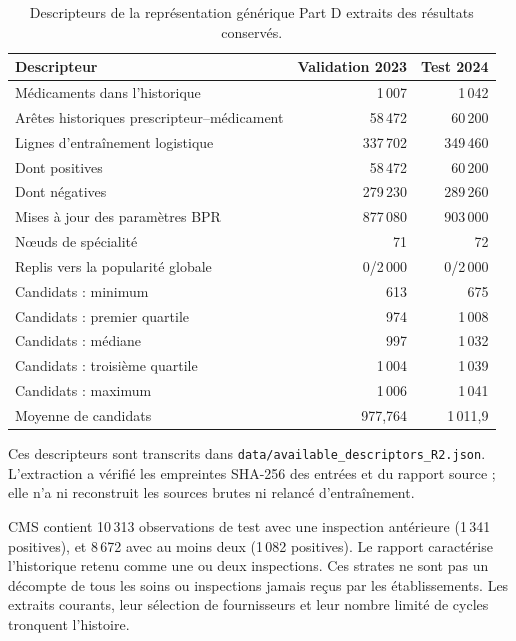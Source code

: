 \documentclass[10pt,a4paper]{article}
\newcommand{\src}[1]{{\small\nolinkurl{#1}}}
\begin{document}
\begin{table}[!htbp]\centering\small
\caption{Descripteurs de la représentation générique Part D extraits des résultats conservés.}
\begin{tabularx}{\linewidth}{@{}Xrr@{}}
\toprule
Descripteur & Validation 2023 & Test 2024\\
\midrule
Médicaments dans l'historique & 1\,007 & 1\,042\\
Arêtes historiques prescripteur--médicament & 58\,472 & 60\,200\\
Lignes d'entraînement logistique & 337\,702 & 349\,460\\
Dont positives & 58\,472 & 60\,200\\
Dont négatives & 279\,230 & 289\,260\\
Mises à jour des paramètres BPR & 877\,080 & 903\,000\\
Nœuds de spécialité & 71 & 72\\
Replis vers la popularité globale & 0/2\,000 & 0/2\,000\\
Candidats : minimum & 613 & 675\\
Candidats : premier quartile & 974 & 1\,008\\
Candidats : médiane & 997 & 1\,032\\
Candidats : troisième quartile & 1\,004 & 1\,039\\
Candidats : maximum & 1\,006 & 1\,041\\
Moyenne de candidats & 977,764 & 1\,011,9\\
\bottomrule
\end{tabularx}
\end{table}

Ces descripteurs sont transcrits dans \src{data/available_descriptors_R2.json}. L'extraction a vérifié les empreintes SHA-256 des entrées et du rapport source ; elle n'a ni reconstruit les sources brutes ni relancé d'entraînement.

CMS contient 10\,313 observations de test avec une inspection antérieure (1\,341 positives), et 8\,672 avec au moins deux (1\,082 positives). Le rapport caractérise l'historique retenu comme une ou deux inspections. Ces strates ne sont pas un décompte de tous les soins ou inspections jamais reçus par les établissements. Les extraits courants, leur sélection de fournisseurs et leur nombre limité de cycles tronquent l'histoire\cite{hgbanalysis,hgbresults}.
\end{document}
